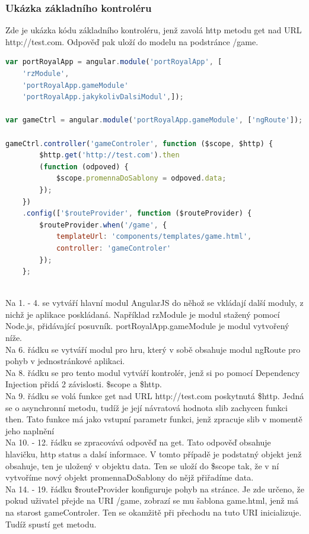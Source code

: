 \documentclass[czech,master,public,dept460,male,cpdeclaration,twoside]{diploma}
\begin{document}
\subsubsection{Ukázka základního kontroléru}
Zde je ukázka kódu základního kontroléru, jenž zavolá http metodu get nad URL http://test.com. Odpověď pak uloží do modelu na podstránce /game.
\begin{lstlisting}[language=JavaScript, caption=Ukázka kontroléru v AngularJS]
var portRoyalApp = angular.module('portRoyalApp', [
    'rzModule',
    'portRoyalApp.gameModule'
    'portRoyalApp.jakykolivDalsiModul',]);

var gameCtrl = angular.module('portRoyalApp.gameModule', ['ngRoute']);

gameCtrl.controller('gameControler', function ($scope, $http) {
        $http.get('http://test.com').then
        (function (odpoved) {
            $scope.promennaDoSablony = odpoved.data;
        });
    })
    .config(['$routeProvider', function ($routeProvider) {
        $routeProvider.when('/game', {
            templateUrl: 'components/templates/game.html',
            controller: 'gameControler'
        });
    };
\end{lstlisting}
~\\
Na 1. - 4. se vytváří hlavní modul AngularJS do něhož se vkládají další moduly, z nichž je aplikace poskládaná. Například rzModule je modul stažený pomocí Node.js, přidávající posuvník. portRoyalApp.gameModule je modul vytvořený níže.\\
Na 6. řádku se vytváří modul pro hru, který v sobě obsahuje modul ngRoute pro pohyb v jednostránkové aplikaci.\\
Na 8. řádku se pro tento modul vytváří kontrolér, jenž si po pomocí Dependency Injection přidá 2 závislosti. \$scope a \$http.\\
Na 9. řádku se volá funkce get nad URL http://test.com poskytnutá \$http. Jedná se o asynchronní metodu, tudíž je její návratová hodnota slib zachycen funkci then. Tato funkce má jako vstupní parametr funkci, jenž zpracuje slib v momentě jeho naplnění\\
Na 10. - 12. řádku se zpracovává odpověď na get. Tato odpověď obsahuje hlavičku, http status a dalsí informace. V tomto případě je podstatný objekt jenž obsahuje, ten je uložený v objektu data. Ten se uloží do \$scope tak, že v ní vytvoříme nový objekt promennaDoSablony do nějž přiřadíme data.\\
Na 14. - 19.  řádku \$routeProvider konfiguruje pohyb na stránce. Je zde určeno, že pokud uživatel přejde na URI /game, zobrazí se mu šablona game.html, jenž má na starost gameControler. Ten se okamžitě při přechodu na tuto URI inicializuje. Tudíž spustí get metodu.
\end{document}
